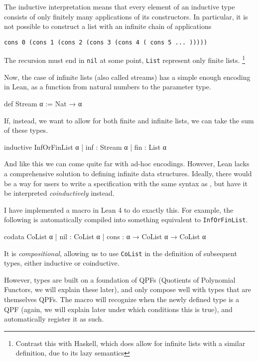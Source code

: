 \documentclass[titlepage]{report}
\newcommand\inductive{\lean{inductive}}
\newcommand\codata{\lean{codata}}
\begin{document}
The inductive interpretation means that every element of an inductive type consists of only
finitely many applications of its constructors. In particular, it is not possible
to construct a list with an infinite chain of  applications
\begin{center}
    \texttt{cons 0 (cons 1 (cons 2 (cons 3 (cons 4 ( cons 5 ... )))))}
\end{center}
The recursion must end in \texttt{nil} at some point, \texttt{List} represent only finite lists.
\footnote{Contrast this with Haskell, which does allow for infinite lists with a similar definition, due to its lazy semantics}


Now, the case of infinite lists (also called streams) has a simple enough encoding in Lean, as a function from natural numbers to the parameter type.
\begin{leancode}
    def Stream α := Nat → α
\end{leancode}

If, instead, we want to allow for both finite and infinite lists, we can take the sum of these types.
\begin{leancode}
    inductive InfOrFinList α
    | inf : Stream α
    | fin : List α 
\end{leancode}

And like this we can come quite far with ad-hoc encodings. 
However, Lean lacks a comprehensive solution to defining infinite data structures.
Ideally, there would be a way for users to write a specification with the same syntax as
\inductive, but have it be interpreted \emph{coinductively} instead.

I have implemented a \codata macro in Lean 4 to do exactly this.
For example, the following is automatically compiled into something equivalent to \texttt{InfOrFinList}.

\begin{leancode}
    codata CoList α 
    | nil  : CoList α
    | cons : α → CoList α → CoList α
\end{leancode}

It is \emph{compositional}, allowing us to use \texttt{CoList} in the definition of subsequent types,
either inductive or coinductive.

However, \codata types are built on a foundation of QPFs (Quotients of Polynomial Functors, we will explain these later), and only compose well with types that are themselves QPFs. 
The \codata macro will recognize when the newly defined type is a QPF (again, we will explain later under which conditions this is true), and automatically register it as such.
\end{document}
